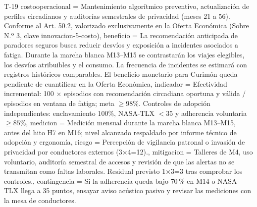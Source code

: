 \begin{formulario}{T-19}
{  costooperacional = {Mantenimiento algorítmico preventivo, actualización de perfiles circadianos y auditorías semestrales de privacidad (meses 21 a 56). Conforme al Art. 50.2, valorizado exclusivamente en la Oferta Económica (Sobre N.º 3, clave innovacion-5-costo)},
  beneficio = {La recomendación anticipada de paradores seguros busca reducir desvíos y exposición a incidentes asociados a fatiga. Durante la marcha blanca M13--M15 se contrastarán los viajes elegibles, los desvíos atribuibles y el consumo. La frecuencia de incidentes se estimará con registros históricos comparables. El beneficio monetario para Curimón queda pendiente de cuantificar en la Oferta Económica},
  indicador = {Efectividad incremental: 100 × episodios con recomendación circadiana oportuna y válida / episodios en ventana de fatiga; meta $\ge98\%$. Controles de adopción independientes: enclavamiento 100\%, NASA-TLX $<35$ y adherencia voluntaria $\ge85\%$},
  medicion = {Medición mensual durante la marcha blanca M13--M15, antes del hito H7 en M16; nivel alcanzado respaldado por informe técnico de adopción y ergonomía},
  riesgo = {Percepción de vigilancia patronal o invasión de privacidad por conductores externos (3×4=12).},
  mitigacion = {Talleres de M4, uso voluntario, auditoría semestral de accesos y revisión de que las alertas no se transmitan como faltas laborales. Residual previsto 1×3=3 tras comprobar los controles.},
  contingencia = {Si la adherencia queda bajo 70\,\% en M14 o NASA-TLX llega a 35 puntos, ensayar aviso acústico pasivo y revisar las mediciones con la mesa de conductores.}
}
\end{formulario}
